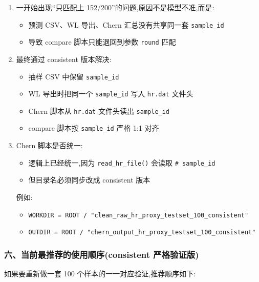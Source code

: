 \documentclass[lang=cn,scheme=chinese,color=blue,device=normal,toc=onecol,math=cm]{elegantbook}
\begin{document}
\begin{enumerate}
\item 一开始出现“只匹配上 152/\allowbreak{}200”的问题,原因不是模型不准,而是: 
\begin{itemize}
\item 预测 CSV、WL 导出、Chern 汇总没有共享同一套 \texttt{sample\_\allowbreak{}id}
\item 导致 compare 脚本只能退回到参数 \texttt{round} 匹配
\end{itemize}
\item 最终通过 consistent 版本解决: 
\begin{itemize}
\item 抽样 CSV 中保留 \texttt{sample\_\allowbreak{}id}
\item WL 导出时把同一个 \texttt{sample\_\allowbreak{}id} 写入 \texttt{hr.dat} 文件头
\item Chern 脚本从 \texttt{hr.dat} 文件头读出 \texttt{sample\_\allowbreak{}id}
\item compare 脚本按 \texttt{sample\_\allowbreak{}id} 严格 1:1 对齐
\end{itemize}
\item Chern 脚本是否统一: 
\begin{itemize}
\item 逻辑上已经统一,因为 \texttt{read\_\allowbreak{}hr\_\allowbreak{}file()} 会读取 \texttt{\# sample\_\allowbreak{}id}
\item 但目录名必须同步改成 consistent 版本
\end{itemize}
 
例如:\par
 
\begin{itemize}
\item \texttt{WORKDIR = ROOT /\allowbreak{} "clean\_\allowbreak{}raw\_\allowbreak{}hr\_\allowbreak{}proxy\_\allowbreak{}testset\_\allowbreak{}100\_\allowbreak{}consistent"}
\item \texttt{OUTDIR = ROOT /\allowbreak{} "chern\_\allowbreak{}output\_\allowbreak{}hr\_\allowbreak{}proxy\_\allowbreak{}testset\_\allowbreak{}100\_\allowbreak{}consistent"}
\end{itemize}
\end{enumerate}


\subsubsection{六、当前最推荐的使用顺序(consistent 严格验证版)}


如果要重新做一套 100 个样本的一一对应验证,推荐顺序如下:\par
\end{document}
